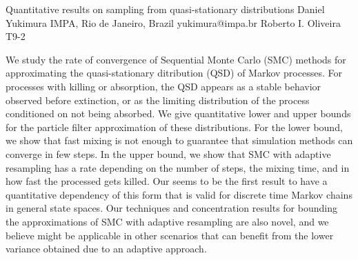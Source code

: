 \begin{talk}
  {Quantitative results on sampling from quasi-stationary distributions}%
  {Daniel Yukimura}%
  {IMPA, Rio de Janeiro, Brazil}%
  {yukimura@impa.br}%
  {Roberto I. Oliveira}%
  {T9-2}%
			
    We study the rate of convergence of Sequential Monte Carlo (SMC) methods for approximating the quasi-stationary ditribution (QSD) of Markov processes. 
    For processes with killing or absorption, the QSD appears as a stable behavior observed before extinction, or as the limiting distribution of the process conditioned on not being absorbed. 
    We give quantitative lower and upper bounds for the particle filter approximation of these distributions.
    For the lower bound, we show that fast mixing is not enough to guarantee that simulation methods can converge in few steps.
    In the upper bound, we show that SMC with adaptive resampling has a rate depending on the number of steps, the mixing time, and in how fast the processed gets killed.
    Our seems to be the first result to have a quantitative dependency of this form that is valid for discrete time Markov chains in general state spaces.
    Our techniques and concentration results for bounding the approximations of SMC with adaptive resampling are also novel, and we believe might be applicable in other scenarios that can benefit from the lower variance obtained due to an adaptive approach.
    
    

\medskip


\end{talk}


